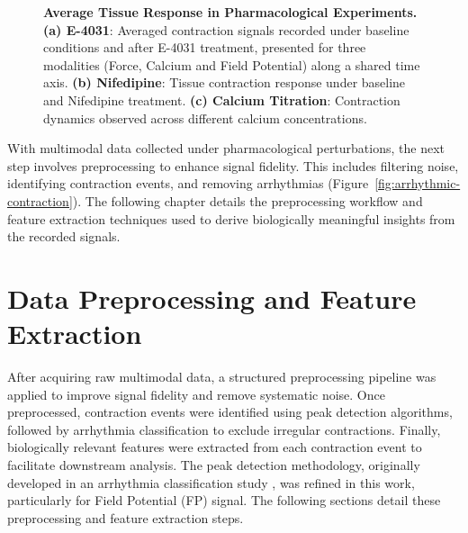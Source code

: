 \documentclass{report}
\begin{document}
\begin{figure}[h]
\begin{subfigure}[b]{0.34\textwidth}
                    \caption[Calcium Titration average contraction]{}
                    \label{fig:ca-titration-average}
                \end{subfigure}
               \caption[Average Tissue Response in Pharmacological Experiments]{\textbf{Average Tissue Response in Pharmacological Experiments.} \textbf{(a) E-4031}: Averaged contraction signals recorded under baseline conditions and after E-4031 treatment, presented for three modalities (Force, Calcium and Field Potential) along a shared time axis. \textbf{(b) Nifedipine}: Tissue contraction response under baseline and Nifedipine treatment. \textbf{(c) Calcium Titration}: Contraction dynamics observed across different calcium concentrations.}
                \label{fig:average-contraction}
            \end{figure}

          With multimodal data collected under pharmacological perturbations, the next step involves preprocessing to enhance signal fidelity. This includes filtering noise, identifying contraction events, and removing arrhythmias (Figure~\ref{fig:arrhythmic-contraction}). The following chapter details the preprocessing workflow and feature extraction techniques used to derive biologically meaningful insights from the recorded signals.

\chapter{Data Preprocessing and Feature Extraction}
\label{data-prep}
    After acquiring raw multimodal data, a structured preprocessing pipeline was applied to improve signal fidelity and remove systematic noise. Once preprocessed, contraction events were identified using peak detection algorithms, followed by arrhythmia classification to exclude irregular contractions. Finally, biologically relevant features were extracted from each contraction event to facilitate downstream analysis. The peak detection methodology, originally developed in an arrhythmia classification study \cite{Sarwar2024}, was refined in this work, particularly for Field Potential (FP) signal. The following sections detail these preprocessing and feature extraction steps.
\end{document}
